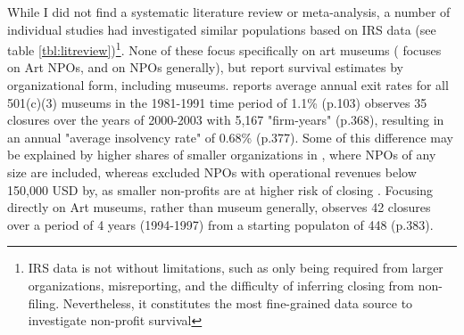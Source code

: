 \documentclass[12pt]{article}
\begin{document}
While I did not find a systematic literature review or meta-analysis, a number of individual studies had investigated similar populations based on IRS data (see table \ref{tbl:litreview})\footnote{IRS data is not without limitations, such as only being required from larger organizations, misreporting, and the difficulty of inferring closing from non-filing. Nevertheless, it constitutes the most fine-grained data source to investigate non-profit survival}.
None of these focus specifically on art museums (\textcite{Hager_2001_vulnerability} focuses on Art NPOs, \textcite{Bowen_1994_charitable} and \cite{Gordon_etal_2013_insolvency} on NPOs generally), but report survival estimates by organizational form, including museums.
\textcite{Bowen_1994_charitable} reports average annual exit rates for all 501(c)(3) museums in the 1981-1991 time period of 1.1\% (p.103)
\textcite{Gordon_etal_2013_insolvency} observes 35 closures over the years of 2000-2003 with 5,167 "firm-years" (p.368), resulting in an annual "average insolvency rate" of 0.68\% (p.377).
Some of this difference may be explained by higher shares of smaller organizations in \textcite{Bowen_1994_charitable}, where NPOs of any size are included, whereas \textcite{Gordon_etal_2013_insolvency} excluded NPOs with operational revenues below 150,000 USD by, as smaller non-profits are at higher risk of closing \parencite{Harrison_Laincz_2008_nonprofit,Helmig_Ingerfurth_Pinz_2013_nonprofit}.
Focusing directly on Art museums, rather than museum generally, \textcite{Hager_2001_vulnerability} observes 42 closures over a period of 4 years (1994-1997) from a starting populaton of 448 (p.383).
\end{document}
